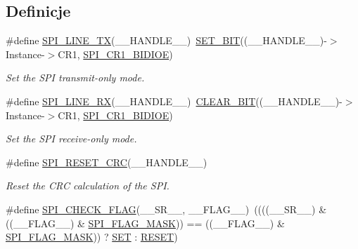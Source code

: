 \subsection*{Definicje}
\begin{DoxyCompactItemize}
\item 
\#define \hyperlink{group___s_p_i___private___macros_gae3b2eb5e818e58b66474d42dedac5523}{S\+P\+I\+\_\+L\+I\+N\+E\+\_\+\+TX}(\+\_\+\+\_\+\+H\+A\+N\+D\+L\+E\+\_\+\+\_\+)~\hyperlink{group___exported__macro_ga26474f43799fbade9cf300e21dd3a91a}{S\+E\+T\+\_\+\+B\+IT}((\+\_\+\+\_\+\+H\+A\+N\+D\+L\+E\+\_\+\+\_\+)-\/$>$Instance-\/$>$C\+R1, \hyperlink{group___peripheral___registers___bits___definition_ga378953916b7701bd49f063c0366b703f}{S\+P\+I\+\_\+\+C\+R1\+\_\+\+B\+I\+D\+I\+OE})
\begin{DoxyCompactList}\small\item\em Set the S\+PI transmit-\/only mode. \end{DoxyCompactList}\item 
\#define \hyperlink{group___s_p_i___private___macros_gaa8d58cef91c1874d5a4dde4014cf6269}{S\+P\+I\+\_\+L\+I\+N\+E\+\_\+\+RX}(\+\_\+\+\_\+\+H\+A\+N\+D\+L\+E\+\_\+\+\_\+)~\hyperlink{group___exported__macro_ga133aae6fc0d41bffab39ab223a7001de}{C\+L\+E\+A\+R\+\_\+\+B\+IT}((\+\_\+\+\_\+\+H\+A\+N\+D\+L\+E\+\_\+\+\_\+)-\/$>$Instance-\/$>$C\+R1, \hyperlink{group___peripheral___registers___bits___definition_ga378953916b7701bd49f063c0366b703f}{S\+P\+I\+\_\+\+C\+R1\+\_\+\+B\+I\+D\+I\+OE})
\begin{DoxyCompactList}\small\item\em Set the S\+PI receive-\/only mode. \end{DoxyCompactList}\item 
\#define \hyperlink{group___s_p_i___private___macros_gab120a0085b72939e7d19c4f6b3381a99}{S\+P\+I\+\_\+\+R\+E\+S\+E\+T\+\_\+\+C\+RC}(\+\_\+\+\_\+\+H\+A\+N\+D\+L\+E\+\_\+\+\_\+)
\begin{DoxyCompactList}\small\item\em Reset the C\+RC calculation of the S\+PI. \end{DoxyCompactList}\item 
\#define \hyperlink{group___s_p_i___private___macros_gae9c6be610681f2142fb012de95e6e59d}{S\+P\+I\+\_\+\+C\+H\+E\+C\+K\+\_\+\+F\+L\+AG}(\+\_\+\+\_\+\+S\+R\+\_\+\+\_\+,  \+\_\+\+\_\+\+F\+L\+A\+G\+\_\+\+\_\+)~((((\+\_\+\+\_\+\+S\+R\+\_\+\+\_\+) \& ((\+\_\+\+\_\+\+F\+L\+A\+G\+\_\+\+\_\+) \& \hyperlink{group___s_p_i___flags__definition_ga1b2ed6861d967c5bc45a7e7c9101d33c}{S\+P\+I\+\_\+\+F\+L\+A\+G\+\_\+\+M\+A\+SK})) == ((\+\_\+\+\_\+\+F\+L\+A\+G\+\_\+\+\_\+) \& \hyperlink{group___s_p_i___flags__definition_ga1b2ed6861d967c5bc45a7e7c9101d33c}{S\+P\+I\+\_\+\+F\+L\+A\+G\+\_\+\+M\+A\+SK})) ? \hyperlink{group___exported__types_gga89136caac2e14c55151f527ac02daaffab44c8101cc294c074709ec1b14211792}{S\+ET} \+: \hyperlink{group___exported__types_gga89136caac2e14c55151f527ac02daaffa589b7d94a3d91d145720e2fed0eb3a05}{R\+E\+S\+ET})

\end{DoxyCompactItemize}
